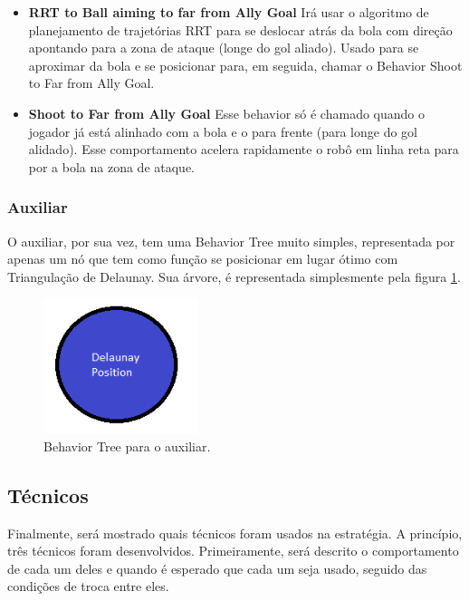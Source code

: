 \documentclass[a4paper,12pt]{article}
\begin{document}
\begin{itemize}
\item \textbf{RRT to Ball aiming to far from Ally Goal} Irá usar o algoritmo de planejamento de trajetórias RRT para se deslocar atrás da bola com direção apontando para a zona de ataque (longe do gol aliado). Usado para se aproximar da bola e se posicionar para, em seguida, chamar o Behavior Shoot to Far from Ally Goal.

\item \textbf{Shoot to Far from Ally Goal} Esse behavior só é chamado quando o jogador já está alinhado com a bola e o para frente (para longe do gol alidado). Esse comportamento acelera rapidamente o robô em linha reta para por a bola na zona de ataque.

\end{itemize}


\subsubsection{Auxiliar}

O auxiliar, por sua vez, tem uma Behavior Tree muito simples, representada por apenas um nó que tem como função se posicionar em lugar ótimo com Triangulação de Delaunay\cite{delaunay34}. Sua árvore, é representada simplesmente pela figura \ref{fig:auxiliar_bt}.

\begin{figure}[H]
	\centering
	\includegraphics[width=0.4\textwidth]{figures/Auxiliar_BT.png}
   \caption{Behavior Tree para o auxiliar.} \label{fig:auxiliar_bt}
\end{figure}


\subsection{Técnicos}

Finalmente, será mostrado quais técnicos foram usados na estratégia. A princípio, três técnicos foram desenvolvidos. Primeiramente, será descrito o comportamento de cada um deles e quando é esperado que cada um seja usado, seguido das condições de troca entre eles.
\end{document}
